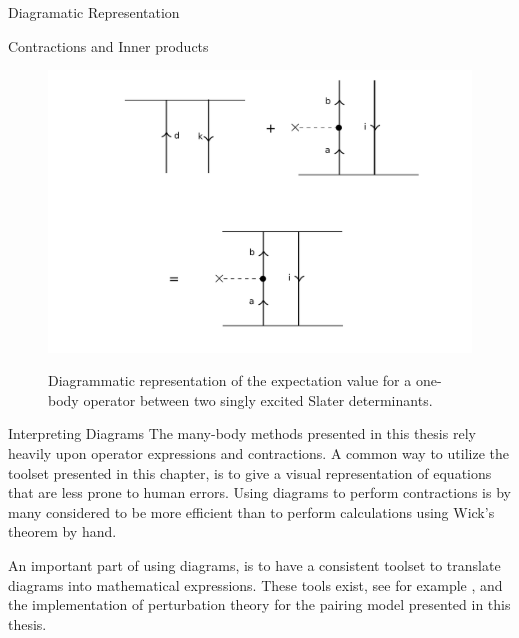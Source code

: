 \documentclass[twoside,english]{uiofysmaster}
\begin{document}
\begin{chapter}{Diagramatic Representation}
\begin{section}{Contractions and Inner products}
\begin{figure}[H]
			\includegraphics[width=\textwidth]{Figures/InnerProduct.pdf}
			\label{InnerProduct}
			\caption{Diagrammatic representation of the expectation value for a one-body operator between two singly excited Slater determinants.}
		\end{figure}
	\end{section}
	\begin{section}{Interpreting Diagrams}	
		The many-body methods presented in this thesis rely heavily upon operator expressions and contractions. A common way to utilize the toolset presented in this chapter, is to give a visual representation of equations that are less prone to human errors. Using diagrams to perform contractions is by many considered to be more efficient than to perform calculations using Wick's theorem by hand. 

		An important part of using diagrams, is to have a consistent toolset to translate diagrams into mathematical expressions. These tools exist, see for example \cite{ShavittAndBartlett}, and the implementation of perturbation theory for the pairing model presented in this thesis. 
	\end{section}

\end{chapter}
\end{document}
